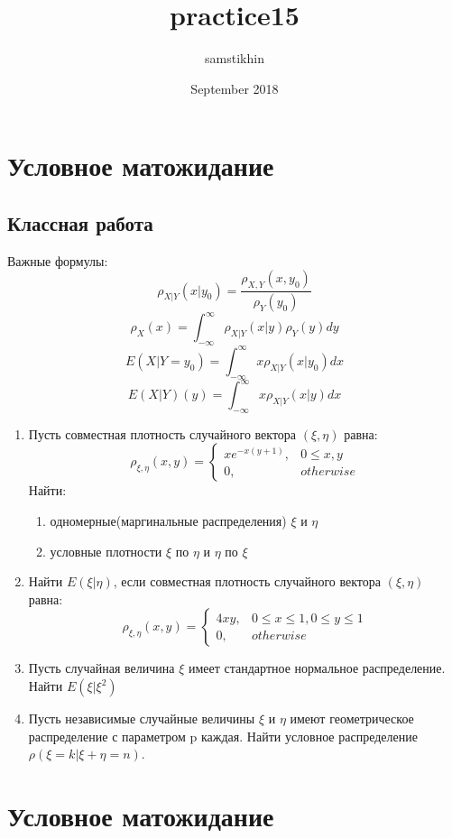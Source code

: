 \documentclass[a4paper, 14pt]{extarticle}
\title{practice15}
\author{samstikhin}
\date{September 2018}
\begin{document}
\section*{Условное матожидание}
\subsection*{Классная работа}
Важные формулы:
$$\rho_{X|Y}(x|y_0) = \frac{\rho_{X,Y}(x, y_0)}{\rho_{Y}(y_0)}$$
$$\rho_{X}(x) = \int_{-\infty}^{\infty} \rho_{X|Y}(x|y)\rho_{Y}(y)dy$$
$$E(X|Y=y_0) = \int_{-\infty}^{\infty}x\rho_{X|Y}(x|y_0)dx$$
$$E(X|Y)(y) = \int_{-\infty}^{\infty}x\rho_{X|Y}(x|y)dx$$
\begin{enumerate}
\item Пусть совместная плотность случайного вектора $(\xi, \eta)$ равна:
$$\rho_{\xi,\eta}(x,y) =\left\{
	\begin{array}{cc}
	xe^{-x(y+1)}, & 0\leq x,y\\
	0, & otherwise
	\end{array}\right.$$
Найти:
\begin{enumerate}
\item одномерные(маргинальные распределения) $\xi$ и $\eta$
\item условные плотности $\xi$ по $\eta$ и $\eta$ по $\xi$
\end{enumerate}
\item Найти $E(\xi|\eta)$, если совместная плотность случайного вектора
$(\xi, \eta)$ равна:
$$\rho_{\xi,\eta}(x,y) =\left\{
	\begin{array}{cc}
	4xy, & 0\leq x\leq 1, 0\leq y\leq 1 \\
	0, & otherwise
	\end{array}\right.$$
\item Пусть случайная величина $\xi$ имеет стандартное нормальное
распределение. Найти $E(\xi|\xi^2)$
\item Пусть независимые случайные величины $\xi$ и $\eta$ имеют геометрическое
распределение с параметром p каждая. Найти условное
распределение $\rho(\xi = k|\xi + \eta = n)$.
\end{enumerate}
\newpage

\section*{Условное матожидание}
\end{document}
